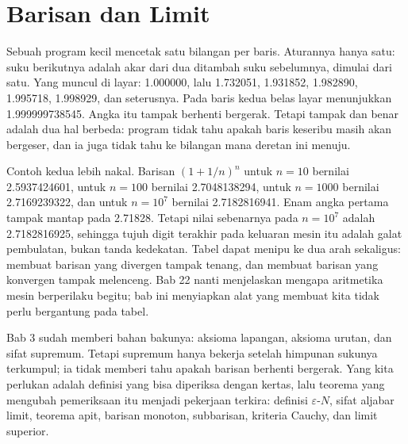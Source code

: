 \chapter{Barisan dan Limit}

Sebuah program kecil mencetak satu bilangan per baris. Aturannya hanya satu: suku
berikutnya adalah akar dari dua ditambah suku sebelumnya, dimulai dari satu. Yang
muncul di layar: 1.000000, lalu 1.732051, 1.931852, 1.982890, 1.995718, 1.998929,
dan seterusnya. Pada baris kedua belas layar menunjukkan 1.999999738545. Angka itu
tampak berhenti bergerak. Tetapi tampak dan benar adalah dua hal berbeda: program
tidak tahu apakah baris keseribu masih akan bergeser, dan ia juga tidak tahu ke
bilangan mana deretan ini menuju.

Contoh kedua lebih nakal. Barisan $(1+1/n)^n$ untuk $n=10$ bernilai 2.5937424601,
untuk $n=100$ bernilai 2.7048138294, untuk $n=1000$ bernilai 2.7169239322, dan
untuk $n=10^7$ bernilai 2.7182816941. Enam angka pertama tampak mantap pada 2.71828.
Tetapi nilai sebenarnya pada $n=10^7$ adalah 2.7182816925, sehingga tujuh digit
terakhir pada keluaran mesin itu adalah galat pembulatan, bukan tanda kedekatan.
Tabel dapat menipu ke dua arah sekaligus: membuat barisan yang divergen tampak
tenang, dan membuat barisan yang konvergen tampak melenceng. Bab 22 nanti
menjelaskan mengapa aritmetika mesin berperilaku begitu; bab ini menyiapkan alat
yang membuat kita tidak perlu bergantung pada tabel.

Bab 3 sudah memberi bahan bakunya: aksioma lapangan, aksioma urutan, dan sifat
supremum. Tetapi supremum hanya bekerja setelah himpunan sukunya terkumpul; ia
tidak memberi tahu apakah barisan berhenti bergerak. Yang kita perlukan adalah
definisi yang bisa diperiksa dengan kertas, lalu teorema yang mengubah pemeriksaan
itu menjadi pekerjaan terkira: definisi $\varepsilon$-$N$, sifat aljabar limit,
teorema apit, barisan monoton, subbarisan, kriteria Cauchy, dan limit superior.

